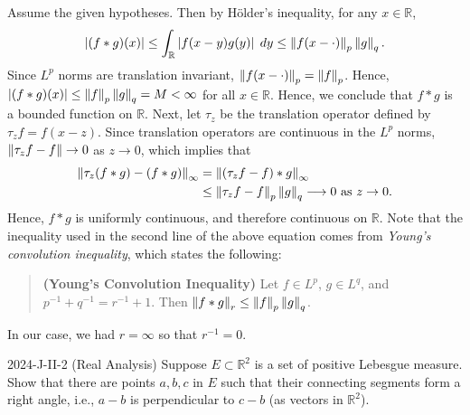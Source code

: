 \documentclass{article}
\begin{document}
\begin{solutions}
	Assume the given hypotheses. Then by H\"older's inequality, for any $x \in \mathbb{R}$, 
		\begin{equation}
			\left| (f \ast g)(x) \right| \leq \int_{\mathbb{R}}\left| f(x -y)g(y) \right|\;dy \leq \left\Vert f(x - \cdot) \right\Vert_{p} \left\Vert g \right\Vert_{q}. 
		\end{equation}
	Since $L^{p}$ norms are translation invariant, $\left\Vert f(x - \cdot) \right\Vert_{p} = \left\Vert f \right\Vert_{p}$. Hence, $|(f \ast g)(x)| \leq \left\Vert f \right\Vert_{p}\left\Vert g \right\Vert_{q} = M < \infty$ for all $x \in \mathbb{R}$. Hence, we conclude that $f \ast g$ is a bounded function on $\mathbb{R}$. Next, let $\tau_{z}$ be the translation operator defined by $\tau_{z}f = f(x - z)$. Since translation operators are continuous in the $L^{p}$ norms, $\left\Vert \tau_{z}f - f \right\Vert \to 0$ as $z \to 0$, which implies that 
		\begin{align}
			\left\Vert \tau_{z}(f \ast g) - (f\ast g) \right\Vert_{\infty} &= \left\Vert (\tau_{z}f - f)\ast g \right\Vert_{\infty} \\
			&\leq \left\Vert \tau_{z}f - f \right\Vert_{p}\left\Vert g \right\Vert_{q} \longrightarrow 0 \text{ as $z \to 0$}. 
		\end{align}
	Hence, $f \ast g$ is uniformly continuous, and therefore continuous on $\mathbb{R}$. Note that the inequality used in the second line of the above equation comes from \textit{Young's convolution inequality}, which states the following: 
		\begin{quote}
			\textbf{(Young's Convolution Inequality)} Let $f \in L^{p}$, $g \in L^{q}$, and $p^{-1} + q^{-1} = r^{-1} + 1$. Then $\left\Vert f \ast g \right\Vert_{r} \leq \left\Vert f \right\Vert_{p} \left\Vert g \right\Vert_{q}$.
		\end{quote}
	In our case, we had $r = \infty$ so that $r^{-1} = 0$. 
\end{solutions}
\begin{prb}{2024-J-II-2 (Real Analysis)}
	Suppose $E \subset \mathbb{R}^{2}$ is a set of positive Lebesgue measure. Show that there are points $a, b, c$ in $E$ such that their connecting segments form a right angle, i.e., $a - b$ is perpendicular to $c - b$ (as vectors in $\mathbb{R}^{2}$). 
\end{prb}
\end{document}
